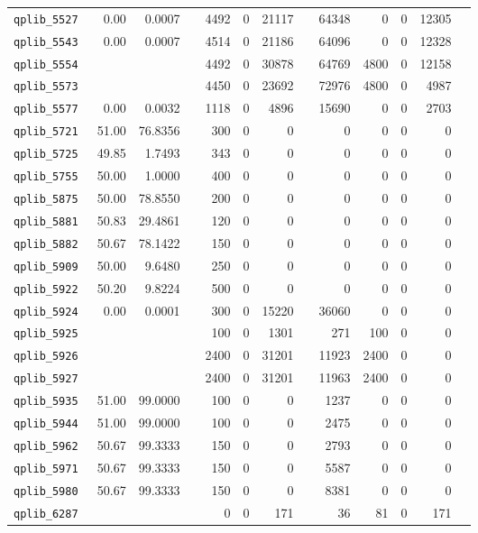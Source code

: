 \begin{longtable}{lrrrrrrrrrrrr}
{\tt 	qplib\_5527	}	&	0.00	&	0.0007	&	&	4492	&	0	&	21117	&	&	64348	&	0	&	0	&	12305	\\
{\tt 	qplib\_5543	}	&	0.00	&	0.0007	&	&	4514	&	0	&	21186	&	&	64096	&	0	&	0	&	12328	\\
{\tt 	qplib\_5554	}	&		&		&	&	4492	&	0	&	30878	&	&	64769	&	4800	&	0	&	12158	\\
{\tt 	qplib\_5573	}	&		&		&	&	4450	&	0	&	23692	&	&	72976	&	4800	&	0	&	4987	\\
{\tt 	qplib\_5577	}	&	0.00	&	0.0032	&	&	1118	&	0	&	4896	&	&	15690	&	0	&	0	&	2703	\\
{\tt 	qplib\_5721	}	&	51.00	&	76.8356	&	&	300	&	0	&	0	&	&	0	&	0	&	0	&	0	\\
{\tt 	qplib\_5725	}	&	49.85	&	1.7493	&	&	343	&	0	&	0	&	&	0	&	0	&	0	&	0	\\
{\tt 	qplib\_5755	}	&	50.00	&	1.0000	&	&	400	&	0	&	0	&	&	0	&	0	&	0	&	0	\\
{\tt 	qplib\_5875	}	&	50.00	&	78.8550	&	&	200	&	0	&	0	&	&	0	&	0	&	0	&	0	\\
{\tt 	qplib\_5881	}	&	50.83	&	29.4861	&	&	120	&	0	&	0	&	&	0	&	0	&	0	&	0	\\
{\tt 	qplib\_5882	}	&	50.67	&	78.1422	&	&	150	&	0	&	0	&	&	0	&	0	&	0	&	0	\\
{\tt 	qplib\_5909	}	&	50.00	&	9.6480	&	&	250	&	0	&	0	&	&	0	&	0	&	0	&	0	\\
{\tt 	qplib\_5922	}	&	50.20	&	9.8224	&	&	500	&	0	&	0	&	&	0	&	0	&	0	&	0	\\
{\tt 	qplib\_5924	}	&	0.00	&	0.0001	&	&	300	&	0	&	15220	&	&	36060	&	0	&	0	&	0	\\
{\tt 	qplib\_5925	}	&		&		&	&	100	&	0	&	1301	&	&	271	&	100	&	0	&	0	\\
{\tt 	qplib\_5926	}	&		&		&	&	2400	&	0	&	31201	&	&	11923	&	2400	&	0	&	0	\\
{\tt 	qplib\_5927	}	&		&		&	&	2400	&	0	&	31201	&	&	11963	&	2400	&	0	&	0	\\
{\tt 	qplib\_5935	}	&	51.00	&	99.0000	&	&	100	&	0	&	0	&	&	1237	&	0	&	0	&	0	\\
{\tt 	qplib\_5944	}	&	51.00	&	99.0000	&	&	100	&	0	&	0	&	&	2475	&	0	&	0	&	0	\\
{\tt 	qplib\_5962	}	&	50.67	&	99.3333	&	&	150	&	0	&	0	&	&	2793	&	0	&	0	&	0	\\
{\tt 	qplib\_5971	}	&	50.67	&	99.3333	&	&	150	&	0	&	0	&	&	5587	&	0	&	0	&	0	\\
{\tt 	qplib\_5980	}	&	50.67	&	99.3333	&	&	150	&	0	&	0	&	&	8381	&	0	&	0	&	0	\\
{\tt 	qplib\_6287	}	&		&		&	&	0	&	0	&	171	&	&	36	&	81	&	0	&	171	\\

\end{longtable}
